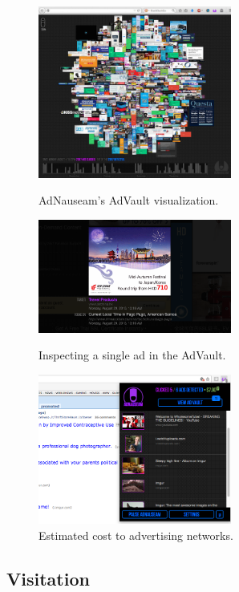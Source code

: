 \documentclass[conference]{IEEEtran}
\begin{document}
\begin{figure}[!t]
\centering
\includegraphics[width=2.5in]{images/vault.png}
\caption{AdNauseam's AdVault visualization.}
\label{fig:vault}
\vspace{10mm}
\includegraphics[width=2.5in]{images/inspector.png}
\caption{Inspecting a single ad in the AdVault.}
\label{fig:inspector}
\vspace{10mm}
\includegraphics[width=2.5in]{images/menu.png}
\caption{Estimated cost to advertising networks.}
\label{fig:menu}
\end{figure}


\subsection{Visitation}
\end{document}
